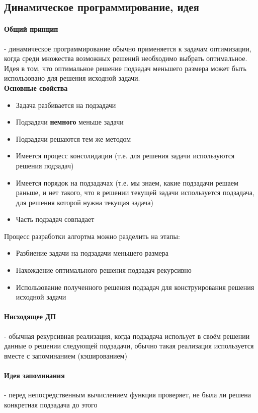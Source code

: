 \documentclass[a4paper,10pt]{article}
\begin{document}
\subsection{Динамическое программирование, идея}
\paragraph{Общий принцип} - динамическое программирование обычно применяется к задачам оптимизации, когда среди множества возможных решений необходимо выбрать оптимальное. Идея в том, что оптимальное решение подзадач меньшего размера может быть использовано для решения исходной задачи. \\
\textbf{Основные свойства} \\
\begin{itemize}
	\item Задача разбивается на подзадачи
	\item Подзадачи \textbf{немного} меньше задачи
	\item Подзадачи решаются тем же методом
	\item Имеется процесс консолидации (т.е. для решения задачи используются решения подзадач)
	\item Имеется порядок на подзадачах (т.е. мы знаем, какие подзадачи решаем раньше, и нет такого, что в решении текущей задачи используется подзадача, для решения которой нужна текущая задача)
	\item Часть подзадач совпадает
\end{itemize}
Процесс разработки алгортма можно разделить на этапы:
\begin{itemize}
	\item Разбиение задачи на подзадачи меньшего размера
	\item Нахождение оптимального решения подзадач рекурсивно
	\item Использование полученного решения подзадач для конструирования решения исходной задачи
\end{itemize}
\paragraph{Нисходящее ДП} - обычная рекурсивная реализация, когда подзадача испольует в своём решении данные о решении следующей подзадачи, обычно такая реализация используется вместе с запоминанием (кэшированием) \\
\paragraph{Идея запоминания} - перед непосредственным вычислением функция проверяет, не была ли решена конкретная подзадача до этого \\
\end{document}
